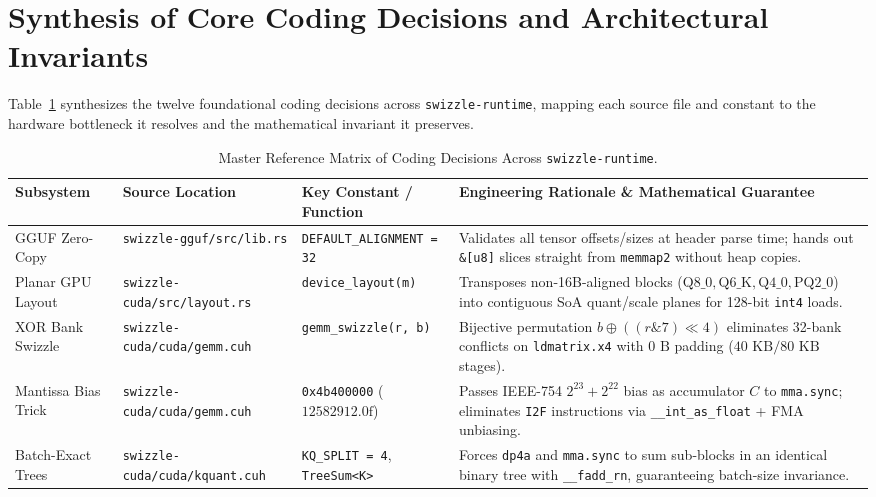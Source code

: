 \documentclass[10pt,a4paper]{article}
\theoremstyle{swzstyle}
\newcommand{\code}[1]{\texttt{#1}}
\begin{document}
\section{Synthesis of Core Coding Decisions and Architectural Invariants}

Table~\ref{tab:coding_decisions_matrix} synthesizes the twelve foundational coding decisions across \code{swizzle-runtime}, mapping each source file and constant to the hardware bottleneck it resolves and the mathematical invariant it preserves.

\begin{table}[htbp]
  \centering
  \caption{Master Reference Matrix of Coding Decisions Across \texttt{swizzle-runtime}.}
  \label{tab:coding_decisions_matrix}
  \footnotesize
  \begin{tabularx}{\textwidth}{@{}lllX@{}}
    \toprule
    \sffamily\bfseries Subsystem & \sffamily\bfseries Source Location & \sffamily\bfseries Key Constant / Function & \sffamily\bfseries Engineering Rationale \& Mathematical Guarantee \\
    \midrule
    GGUF Zero-Copy & \code{swizzle-gguf/src/lib.rs} & \code{DEFAULT\_ALIGNMENT = 32} & Validates all tensor offsets/sizes at header parse time; hands out \code{\&[u8]} slices straight from \code{memmap2} without heap copies. \\
    Planar GPU Layout & \code{swizzle-cuda/src/layout.rs} & \code{device\_layout(m)} & Transposes non-16B-aligned blocks ($\text{Q8\_0}, \text{Q6\_K}, \text{Q4\_0}, \text{PQ2\_0}$) into contiguous SoA quant/scale planes for 128-bit \code{int4} loads. \\
    XOR Bank Swizzle & \code{swizzle-cuda/cuda/gemm.cuh} & \code{gemm\_swizzle(r, b)} & Bijective permutation $b \oplus ((r \mathbin{\&} 7) \ll 4)$ eliminates 32-bank conflicts on \code{ldmatrix.x4} with $0\text{ B}$ padding ($40\text{ KB} / 80\text{ KB}$ stages). \\
    Mantissa Bias Trick & \code{swizzle-cuda/cuda/gemm.cuh} & \code{0x4b400000} ($12582912.0\text{f}$) & Passes IEEE-754 $2^{23}+2^{22}$ bias as accumulator $C$ to \code{mma.sync}; eliminates \code{I2F} instructions via \code{\_\_int\_as\_float} + FMA unbiasing. \\
    Batch-Exact Trees & \code{swizzle-cuda/cuda/kquant.cuh} & \code{KQ\_SPLIT = 4}, \code{TreeSum<K>} & Forces \code{dp4a} and \code{mma.sync} to sum sub-blocks in an identical binary tree with \code{\_\_fadd\_rn}, guaranteeing batch-size invariance. \\

\end{tabularx}
\end{table}
\end{document}
